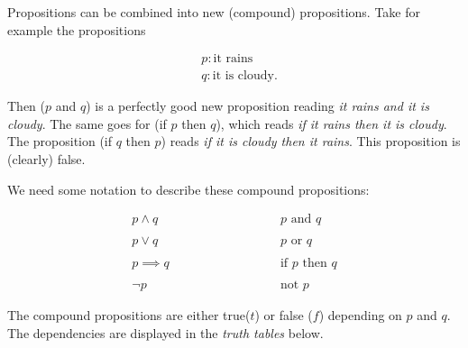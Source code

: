 \documentclass{article}
\begin{document}
Propositions can be combined into
new (compound) propositions. Take for example the propositions

\begin{align*}
&p: \text{it rains}\\
&q: \text{it is cloudy}.
\end{align*}
  
  Then ($p$ and $q$) is a perfectly good
  new proposition reading \emph{it rains and it is cloudy}. The same goes for (if $p$ then $q$), which reads
  \emph{if it rains then it is cloudy}. The proposition (if $q$ then $p$) reads \emph{if it is cloudy then
    it rains}. This proposition is (clearly) false.



We need some notation to describe these compound propositions:

\begin{equation*}
\begin{array}{ll}
p \land q\qquad\qquad & \qquad\qquad p \text{ and } q\\
\\
p \lor q\qquad\qquad & \qquad\qquad p \text{ or } q\\
\\
p\implies q\qquad\qquad & \qquad\qquad \text{if } p \text{ then } q\\
\\
\neg p\qquad\qquad & \qquad\qquad \text{not } p
\end{array}
\end{equation*}

The compound propositions are either true($t$) or false ($f$) depending on
$p$ and $q$. The dependencies are displayed in the \emph{truth tables} below.
\end{document}
